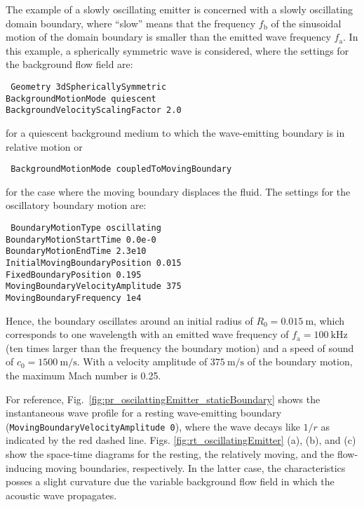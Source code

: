 The example of a slowly oscillating emitter is concerned with a slowly oscillating domain boundary, where ``slow'' means that the frequency $f_{\mathrm{b}}$ of the sinusoidal motion of the domain boundary is smaller than the emitted wave frequency $f_{\mathrm{a}}$. In this example, a spherically symmetric wave is considered, where the settings for the background flow field are:

{\tt
Geometry 3dSphericallySymmetric \\
BackgroundMotionMode quiescent \\
BackgroundVelocityScalingFactor 2.0
}

for a quiescent background medium to which the wave-emitting boundary is in relative motion or

    {\tt
        BackgroundMotionMode coupledToMovingBoundary\\
    }

for the case where the moving boundary displaces the fluid. The settings for the oscillatory boundary motion are:

{\tt
BoundaryMotionType oscillating \\
BoundaryMotionStartTime 0.0e-0 \\
BoundaryMotionEndTime 2.3e10 \\
InitialMovingBoundaryPosition 0.015 \\
FixedBoundaryPosition 0.195 \\
MovingBoundaryVelocityAmplitude 375 \\
MovingBoundaryFrequency 1e4
}

Hence, the boundary oscillates around an initial radius of $R_0=0.015\:\mathrm{m}$, which corresponds to one wavelength with an emitted wave frequency of $f_{\mathrm{a}}=100\:\mathrm{kHz}$ (ten times larger than the frequency the boundary motion) and a speed of sound of $c_0=1500\:\mathrm{m/s}$. With a velocity amplitude of $375\:\mathrm{m/s}$ of the boundary motion, the maximum Mach number is 0.25.

For reference, Fig.~\ref{fig:pr_oscilattingEmitter_staticBoundary} shows the instantaneous wave profile for a resting wave-emitting boundary ({\tt MovingBoundaryVelocityAmplitude 0}), where the wave decays like $1/r$ as indicated by the red dashed line. Figs. \ref{fig:rt_oscillatingEmitter} (a), (b), and (c) show the space-time diagrams for the resting, the relatively moving, and the flow-inducing moving boundaries, respectively. In the latter case, the characteristics posses a slight curvature due the variable background flow field in which the acoustic wave propagates.

